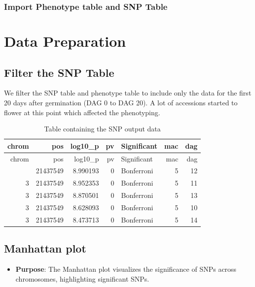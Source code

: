 \documentclass[
  11pt,
]{article}
\providecommand{\tightlist}{%
  \setlength{\itemsep}{0pt}\setlength{\parskip}{0pt}}\usepackage{longtable,booktabs,array}
\begin{document}
\subsubsection{Import Phenotype table and SNP
Table}\label{import-phenotype-table-and-snp-table}

\section{Data Preparation}\label{data-preparation}

\subsection{Filter the SNP Table}\label{filter-the-snp-table}

We filter the SNP table and phenotype table to include only the data for
the first 20 days after germination (DAG 0 to DAG 20). A lot of
accessions started to flower at this point which affected the
phenotyping.

\begin{longtable}[]{@{}rrrrlrr@{}}
\caption{Table containing the SNP output data}\tabularnewline
\toprule\noalign{}
chrom & pos & log10\_p & pv & Significant & mac & dag \\
\midrule\noalign{}
\endfirsthead
\toprule\noalign{}
chrom & pos & log10\_p & pv & Significant & mac & dag \\
\midrule\noalign{}
\endhead
\bottomrule\noalign{}
\endlastfoot
3 & 21437549 & 8.990193 & 0 & Bonferroni & 5 & 12 \\
3 & 21437549 & 8.952353 & 0 & Bonferroni & 5 & 11 \\
3 & 21437549 & 8.870501 & 0 & Bonferroni & 5 & 13 \\
3 & 21437549 & 8.628093 & 0 & Bonferroni & 5 & 10 \\
3 & 21437549 & 8.473713 & 0 & Bonferroni & 5 & 14 \\
\end{longtable}

\subsection{Manhattan plot}\label{manhattan-plot}

\begin{itemize}
\tightlist
\item
  \textbf{Purpose}: The Manhattan plot visualizes the significance of
  SNPs across chromosomes, highlighting significant SNPs.
\end{itemize}
\end{document}
